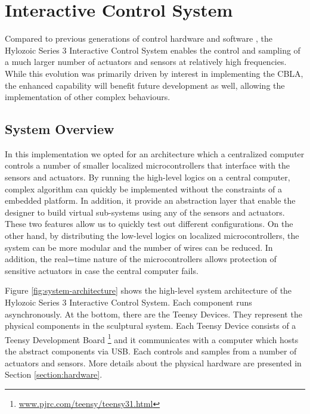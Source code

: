 \chapter{Interactive Control System} \label{chap:ctrl_system}

Compared to previous generations of control hardware and software \cite{Beesley2007.book},  the Hylozoic Series 3 Interactive Control System enables the control and sampling of a much larger number of actuators and sensors at relatively high frequencies.  While this evolution was primarily driven by interest in implementing the CBLA, the enhanced capability will benefit future development as well, allowing the implementation of other complex behaviours.


\section{System Overview}

In this implementation we opted for an architecture which a centralized computer controls a number of smaller localized microcontrollers that interface with the sensors and actuators. By running the high-level logics on a central computer, complex algorithm can quickly be implemented without the constraints of a embedded platform. In addition, it provide an abstraction layer that enable the designer to build virtual sub-systems using any of the sensors and actuators. These two features allow us to quickly test out different configurations. 
On the other hand, by distributing the low-level logics on localized microcontrollers, the system can be more modular and the number of wires can be reduced. In addition, the real=time nature of the microcontrollers allows protection of sensitive actuators in case the central computer fails. 


Figure \ref{fig:system-architecture} shows the high-level system architecture of the Hylozoic Series 3 Interactive Control System. Each component runs asynchronously. At the bottom, there are the Teensy Devices. They represent the physical components in the sculptural system. Each Teensy Device consists of a Teensy Development Board \footnote{\url{www.pjrc.com/teensy/teensy31.html}} and it communicates with a computer which hosts the abstract components via USB. Each controls and samples from a number of actuators and sensors. More details about the physical hardware are presented in Section \ref{section:hardware}. 

